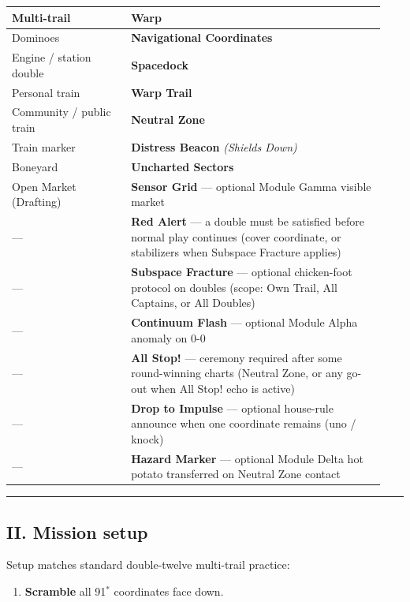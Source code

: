 \documentclass[11pt]{article}
\providecommand{\tightlist}{%
  \setlength{\itemsep}{0pt}\setlength{\parskip}{0pt}}
\begin{document}
\begin{longtable}[]{@{}>{\raggedright\arraybackslash}p{0.30\linewidth}>{\raggedright\arraybackslash}p{0.64\linewidth}@{}}
\toprule\noalign{}
Multi-trail & Warp \\
\midrule\noalign{}
\endhead
\bottomrule\noalign{}
\endlastfoot
Dominoes & \textbf{Navigational Coordinates} \\
Engine / station double & \textbf{Spacedock} \\
Personal train & \textbf{Warp Trail} \\
Community / public train & \textbf{Neutral Zone} \\
Train marker & \textbf{Distress Beacon} \emph{(Shields Down)} \\
Boneyard & \textbf{Uncharted Sectors} \\
Open Market (Drafting) & \textbf{Sensor Grid} --- optional Module Gamma
visible market \\
--- & \textbf{Red Alert} --- a double must be satisfied before normal
play continues (cover coordinate, or stabilizers when Subspace Fracture
applies) \\
--- & \textbf{Subspace Fracture} --- optional chicken-foot protocol on
doubles (scope: Own Trail, All Captains, or All Doubles) \\
--- & \textbf{Continuum Flash} --- optional Module Alpha anomaly on
0-0 \\
--- & \textbf{All Stop!} --- ceremony required after some round-winning
charts (Neutral Zone, or any go-out when All Stop! echo is active) \\
--- & \textbf{Drop to Impulse} --- optional house-rule announce when one
coordinate remains (uno / knock) \\
--- & \textbf{Hazard Marker} --- optional Module Delta hot potato
transferred on Neutral Zone contact \\
\end{longtable}

\begin{center}\rule{0.5\linewidth}{0.5pt}\end{center}

\subsection{II. Mission setup}\label{ii-mission-setup}

Setup matches standard double-twelve multi-trail practice:

\begin{enumerate}
\def\labelenumi{\arabic{enumi}.}
\tightlist
\item
  \textbf{Scramble} all 91\(^*\) coordinates face down.
\end{enumerate}
\end{document}
